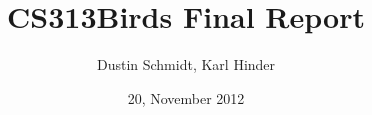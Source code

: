 \documentclass[a4paper,10pt]{article}
\title{CS313\n Birds \n Final Report}
\author{Dustin Schmidt, Karl Hinder}
\date{20, November 2012}
\begin{document}
\maketitle

\begin{Overview}
 
\end{Overview}
\end{document}
